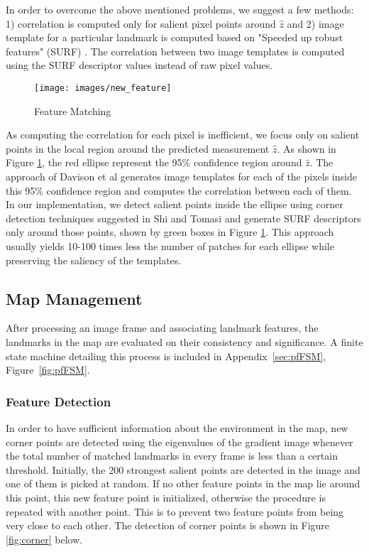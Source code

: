 \documentclass[conference]{IEEEtran}
\begin{document}
In order to overcome the above mentioned problems, we suggest a few methods: 1) correlation is computed only for salient pixel points around $\hat{z}$ and 2) image template for a particular landmark is computed based on "Speeded up robust features" (SURF) \cite{BAY2008346}. The correlation between two image templates is computed using the SURF descriptor values instead of raw pixel values.

\begin{figure}[h]
\centering
\texttt{[image: images/new\_feature]}
\caption{Feature Matching}
\label{fig:matching}
\end{figure}

As computing the correlation for each pixel is inefficient, we focus only on salient points in the local region around the predicted measurement $\hat{z}$. As shown in Figure \ref{fig:matching}, the red ellipse represent the 95\% confidence region around $\hat{z}$. The approach of Davison et al generates image templates for each of the pixels inside this 95\% confidence region and computes the correlation between each of them. In our implementation, we detect salient points inside the ellipse using corner detection techniques suggested in Shi and Tomasi \cite{323794} and generate SURF descriptors only around those points, shown by green boxes in Figure \ref{fig:matching}. This approach usually yields 10-100 times less the number of patches for each ellipse while preserving the saliency of the templates.

\subsection{Map Management}
After processing an image frame and associating landmark features, the landmarks in the map are evaluated on their consistency and significance. A finite state machine detailing this process is included in Appendix~\ref{sec:pfFSM}, Figure~\ref{fig:pfFSM}.

\subsubsection{Feature Detection}
In order to have sufficient information about the environment in the map, new corner points are detected using the eigenvalues of the gradient image whenever the total number of matched landmarks in every frame is less than a certain threshold. Initially, the 200 strongest salient points are detected in the image and one of them is picked at random. If no other feature points in the map lie around this point, this new feature point is initialized, otherwise the procedure is repeated with another point. This is to prevent two feature points from being very close to each other. The detection of corner points is shown in Figure \ref{fig:corner} below.
\end{document}
